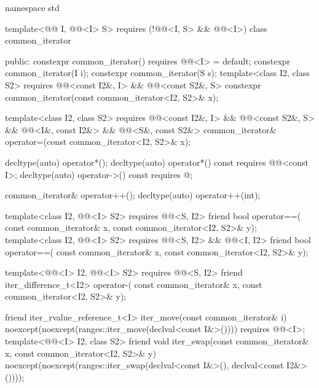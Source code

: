 %
\begin{codeblock}
namespace std {
  template<@@ I, @@<I> S>
    requires (!@@<I, S> && @@<I>)
  class common_iterator {
  public:
    constexpr common_iterator() requires @@<I> = default;
    constexpr common_iterator(I i);
    constexpr common_iterator(S s);
    template<class I2, class S2>
      requires @@<const I2&, I> && @@<const S2&, S>
        constexpr common_iterator(const common_iterator<I2, S2>& x);

    template<class I2, class S2>
      requires @@<const I2&, I> && @@<const S2&, S> &&
               @@<I&, const I2&> && @@<S&, const S2&>
        common_iterator& operator=(const common_iterator<I2, S2>& x);

    decltype(auto) operator*();
    decltype(auto) operator*() const
      requires @@<const I>;
    decltype(auto) operator->() const
      requires @\seebelow@;

    common_iterator& operator++();
    decltype(auto) operator++(int);

    template<class I2, @@<I> S2>
      requires @@<S, I2>
    friend bool operator==(
      const common_iterator& x, const common_iterator<I2, S2>& y);
    template<class I2, @@<I> S2>
      requires @@<S, I2> && @@<I, I2>
    friend bool operator==(
      const common_iterator& x, const common_iterator<I2, S2>& y);

    template<@@<I> I2, @@<I> S2>
      requires @@<S, I2>
    friend iter_difference_t<I2> operator-(
      const common_iterator& x, const common_iterator<I2, S2>& y);

    friend iter_rvalue_reference_t<I> iter_move(const common_iterator& i)
      noexcept(noexcept(ranges::iter_move(declval<const I&>())))
        requires @@<I>;
    template<@@<I> I2, class S2>
      friend void iter_swap(const common_iterator& x, const common_iterator<I2, S2>& y)
        noexcept(noexcept(ranges::iter_swap(declval<const I&>(), declval<const I2&>())));

}}
\end{codeblock}
